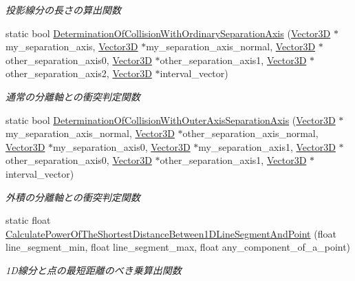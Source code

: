 \begin{DoxyCompactItemize}
\begin{DoxyCompactList}\small\item\em 投影線分の長さの算出関数 \end{DoxyCompactList}\item 
static bool \mbox{\hyperlink{class_collision_calculation_adc04a190b8bf8696880ea33d8ef01b09}{Determination\+Of\+Collision\+With\+Ordinary\+Separation\+Axis}} (\mbox{\hyperlink{class_vector3_d}{Vector3D}} $\ast$my\+\_\+separation\+\_\+axis, \mbox{\hyperlink{class_vector3_d}{Vector3D}} $\ast$my\+\_\+separation\+\_\+axis\+\_\+normal, \mbox{\hyperlink{class_vector3_d}{Vector3D}} $\ast$other\+\_\+separation\+\_\+axis0, \mbox{\hyperlink{class_vector3_d}{Vector3D}} $\ast$other\+\_\+separation\+\_\+axis1, \mbox{\hyperlink{class_vector3_d}{Vector3D}} $\ast$other\+\_\+separation\+\_\+axis2, \mbox{\hyperlink{class_vector3_d}{Vector3D}} $\ast$interval\+\_\+vector)
\begin{DoxyCompactList}\small\item\em 通常の分離軸との衝突判定関数 \end{DoxyCompactList}\item 
static bool \mbox{\hyperlink{class_collision_calculation_a7ad238e8d35646bf4034879204d94533}{Determination\+Of\+Collision\+With\+Outer\+Axis\+Separation\+Axis}} (\mbox{\hyperlink{class_vector3_d}{Vector3D}} $\ast$my\+\_\+separation\+\_\+axis\+\_\+normal, \mbox{\hyperlink{class_vector3_d}{Vector3D}} $\ast$other\+\_\+separation\+\_\+axis\+\_\+normal, \mbox{\hyperlink{class_vector3_d}{Vector3D}} $\ast$my\+\_\+separation\+\_\+axis0, \mbox{\hyperlink{class_vector3_d}{Vector3D}} $\ast$my\+\_\+separation\+\_\+axis1, \mbox{\hyperlink{class_vector3_d}{Vector3D}} $\ast$other\+\_\+separation\+\_\+axis0, \mbox{\hyperlink{class_vector3_d}{Vector3D}} $\ast$other\+\_\+separation\+\_\+axis1, \mbox{\hyperlink{class_vector3_d}{Vector3D}} $\ast$interval\+\_\+vector)
\begin{DoxyCompactList}\small\item\em 外積の分離軸との衝突判定関数 \end{DoxyCompactList}\item 
static float \mbox{\hyperlink{class_collision_calculation_a2b210c0e981995e209a86d2f521608d1}{Calculate\+Power\+Of\+The\+Shortest\+Distance\+Between1\+D\+Line\+Segment\+And\+Point}} (float line\+\_\+segment\+\_\+min, float line\+\_\+segment\+\_\+max, float any\+\_\+component\+\_\+of\+\_\+a\+\_\+point)
\begin{DoxyCompactList}\small\item\em 1\+D線分と点の最短距離のべき乗算出関数 \end{DoxyCompactList}\item 

\end{DoxyCompactItemize}
